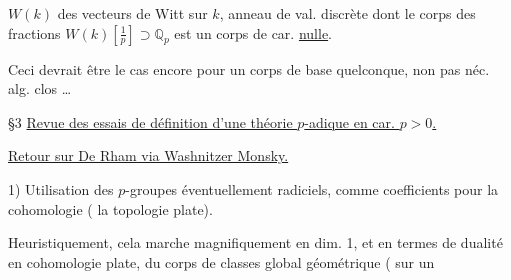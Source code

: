 
$W(k)$ des vecteurs de Witt sur $k$, anneau de val. discrète dont le corps des fractions $W(k)[\frac1p]\supset\mathbb Q_p$ est un corps de car. \uline{nulle}.

Ceci devrait être le cas encore pour un corps de base  quelconque, non pas néc. alg. clos \ldots

\S 3 \uline{Revue des essais de définition d'une théorie  $p$-adique en car. $p>0$.}

\uline{Retour sur De Rham via Washnitzer Monsky.}


1) Utilisation des $p$-groupes éventuellement radiciels,  comme coefficients pour la cohomologie ( la topologie plate).

Heuristiquement, cela marche magnifiquement en dim. 1, et    en termes  de dualité en cohomologie plate, du corps de classes global géométrique ( sur un

